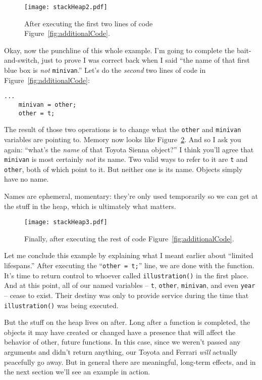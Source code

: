 \begin{figure}
\centering
\texttt{[image: stackHeap2.pdf]}   %
\caption{After executing the first two lines of code
Figure~\ref{fig:additionalCode}.}
\label{fig:stackHeap2}
\end{figure}


Okay, now the punchline of this whole example. I'm going to complete the
bait-and-switch, just to prove I was correct back when I said ``the name of
that first blue box is \textit{not} \texttt{minivan}.'' Let's do the
\textit{second} two lines of code in Figure~\ref{fig:additionalCode}:

\begin{Verbatim}[fontsize=\small,samepage=true,frame=single]
    ...
    minivan = other;
    other = t;
\end{Verbatim}

The result of those two operations is to change what the \texttt{other} and
\texttt{minivan} variables are pointing to. Memory now looks like
Figure~\ref{fig:stackHeap3}. And so I ask you again: ``what's the
\textit{name} of that Toyota Sienna object?'' I think you'll agree that
\texttt{minivan} is most certainly \textit{not} its name. Two valid ways to
refer to it are \texttt{t} and \texttt{other}, both of which point to it. But
neither one is its name. Objects simply have no name.

Names are ephemeral, momentary: they're only used temporarily so we can get at
the stuff in the heap, which is ultimately what matters.

\begin{figure}
\centering
\texttt{[image: stackHeap3.pdf]}   %
\caption{Finally, after executing the rest of code
Figure~\ref{fig:additionalCode}.}
\label{fig:stackHeap3}
\end{figure}

Let me conclude this example by explaining what I meant earlier about
``limited lifespans.'' After executing the ``\texttt{other = t;}'' line, we are
done with the function. It's time to return control to whoever called
\texttt{illustration()} in the first place. And at this point, all of our
named variables -- \texttt{t}, \texttt{other}, \texttt{minivan}, and even
\texttt{year} -- cease to exist. Their destiny was only to provide service
during the time that \texttt{illustration()} was being executed. 

But the stuff on the heap lives on after. Long after a function is completed,
the objects it may have created or changed have a presence that will affect
the behavior of other, future functions. In this case, since we weren't passed
any arguments and didn't return anything, our Toyota and Ferrari \textit{will}
actually peacefully go away. But in general there are meaningful, long-term
effects, and in the next section we'll see an example in action.

